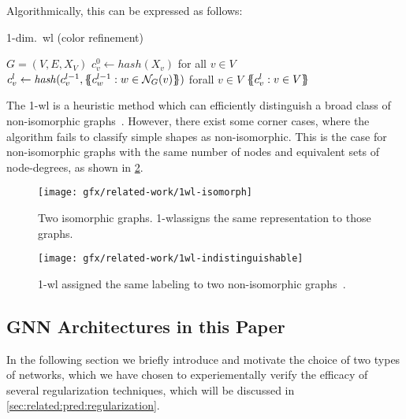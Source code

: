 Algorithmically, this can be expressed as follows:
\begin{algorithm}[H]
    \caption{1-dim.\ \ac{wl} (color refinement)}
    \begin{algorithmic}[1]
        \Require $G = (V,E,X_{V})$
        \State $c_{v}^{0} \gets \mathit{hash}(X_{v})$ for all $v \in V$
        \Repeat
        \State $c_{v}^{l} \gets \mathit{hash}(c_{v}^{l-1}, \ldblbrace c_{w}^{l-1}: w \in \mathcal N_{G}(v)\rdblbrace)$ forall $v \in V$
        \State \Return $\ldblbrace c_{v}^l : v \in V \rdblbrace$
    \end{algorithmic}
\end{algorithm}

The 1-\ac{wl} is a heuristic method which can efficiently distinguish a broad class of non-isomorphic
graphs~\cite{Babai1979}.
However, there exist some corner cases, where the algorithm fails to classify
simple shapes as non-isomorphic. This is the case for non-isomorphic graphs with the same number of nodes and equivalent sets of node-degrees, as shown in \cref*{fig:related:1-wl-indistinguishable}.

\begin{figure}[H]
    \centering
    \texttt{[image: gfx/related-work/1wl-isomorph]}
    \caption{Two isomorphic graphs. 1-\ac{wl}assigns the same representation to those graphs.}\label{fig:related:1-wl-indistinguishable}
\end{figure}

\begin{figure}[H]
    \centering
    \texttt{[image: gfx/related-work/1wl-indistinguishable]}
    \caption{1-\ac{wl} assigned the same labeling to two non-isomorphic graphs~\cite{Liu2022}.}\label{fig:related:1-wl-indistinguishable}
\end{figure}


\subsection{GNN Architectures in this Paper}
\label{sec:related:architectures}


In the following section we briefly introduce and
motivate the choice of two types of networks, which we have
chosen to experiementally verify the efficacy of several regularization techniques, which will be discussed in \cref{sec:related:pred:regularization}.

